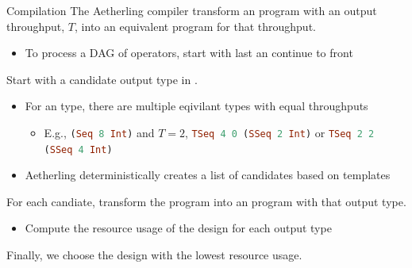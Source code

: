 \begin{frame}{Compilation}
    The Aetherling compiler transform an \Lseq program with an output throughput, $T$, into an equivalent \Lst program for that throughput.

    \begin{itemize}
        \item To process a DAG of operators, start with last an continue to front
    \end{itemize}

    Start with a candidate output type in \Lst.

    \begin{itemize}
        \item For an \Lseq type, there are multiple eqivilant \Lst types with equal throughputs
        \begin{itemize}
            \item E.g., \lstinline[language=Haskell]{(Seq 8 Int)} and $T=2$, \lstinline[language=Haskell]|TSeq 4 0 (SSeq 2 Int)| or \lstinline[language=Haskell]|TSeq 2 2 (SSeq 4 Int)|
        \end{itemize}
        \item Aetherling deterministically creates a list of candidates based on templates
    \end{itemize}

    For each candiate, transform the \Lseq program into an \Lst program with that output type.

    \begin{itemize}
        \item Compute the resource usage of the design for each output type
    \end{itemize}

    Finally, we choose the design with the lowest resource usage.

\end{frame}